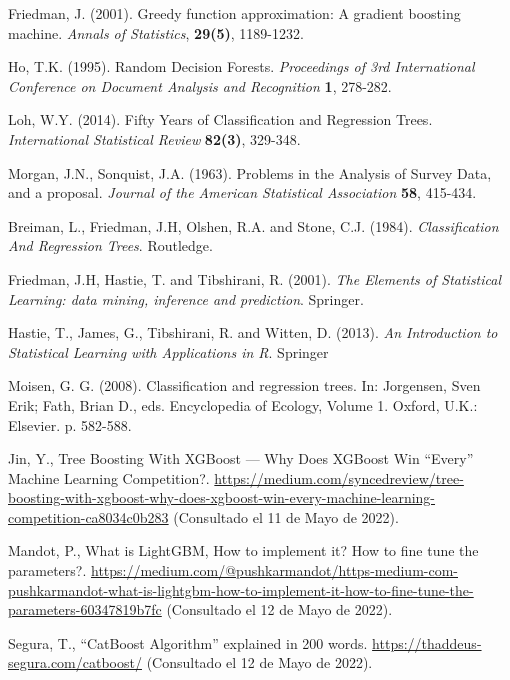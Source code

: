 \documentclass[12pt,twoside]{article}
\begin{document}
\begin{thebibliography}{100}
 Friedman, J. (2001). Greedy function approximation: A gradient boosting machine. \textit{Annals of Statistics}, \textbf{29(5)}, 1189-1232.

 Ho, T.K. (1995). Random Decision Forests. \textit{Proceedings of 3rd International Conference on Document Analysis and Recognition} \textbf{1}, 278-282.

 Loh, W.Y. (2014). Fifty Years of Classification and Regression Trees. \textit{International Statistical Review}
\textbf{82(3)}, 329-348.

 Morgan, J.N., Sonquist, J.A. (1963). Problems in the Analysis of Survey Data, and a proposal. \textit{Journal of the American Statistical Association} \textbf{58}, 415-434.



 Breiman, L., Friedman, J.H, Olshen, R.A. and Stone, C.J. (1984).
\textit{Classification And Regression Trees}. Routledge.

 Friedman, J.H, Hastie, T. and Tibshirani, R. (2001).
\textit{The Elements of Statistical Learning: data mining, inference and prediction}. Springer.

 Hastie, T., James, G., Tibshirani, R. and Witten, D. (2013).
\textit{An Introduction to Statistical Learning with Applications in R}. Springer



 Moisen, G. G. (2008). Classification and regression trees. In: Jorgensen, Sven Erik; Fath, Brian D., eds. Encyclopedia of Ecology, Volume 1. Oxford, U.K.: Elsevier. p. 582-588.



 Jin, Y., Tree Boosting With XGBoost — Why Does XGBoost Win ``Every'' Machine Learning Competition?. \url{https://medium.com/syncedreview/tree-boosting-with-xgboost-why-does-xgboost-win-every-machine-learning-competition-ca8034c0b283} (Consultado el 11 de Mayo de 2022).

 Mandot, P., What is LightGBM, How to implement it? How to fine tune the parameters?. \url{https://medium.com/@pushkarmandot/https-medium-com-pushkarmandot-what-is-lightgbm-how-to-implement-it-how-to-fine-tune-the-parameters-60347819b7fc} (Consultado el 12 de Mayo de 2022).

 Segura, T., ``CatBoost Algorithm'' explained in 200 words. \url{https://thaddeus-segura.com/catboost/} (Consultado el 12 de Mayo de 2022).

\end{thebibliography}
\end{document}
